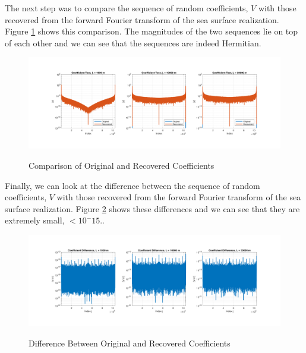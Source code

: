 The next step was to compare the sequence of random coefficients, $V$ with those recovered from the forward Fourier transform of the sea surface realization. Figure \ref{os_fig:10} shows this comparison. The magnitudes of the two sequences lie on top of each other and we can see that the sequences are indeed Hermitian.
\begin{figure}[H]
  \begin{center}
\includegraphics[width=6in]{../media/Ocean_Surface/random_variable_test.png}
  \end{center}
  \renewcommand{\baselinestretch}{1} \small\normalsize
  \begin{quote}
    \caption[Comparison of Original and Recovered Coefficients]{Comparison of Original and Recovered Coefficients\label{os_fig:10}}
  \end{quote}
\end{figure}
\renewcommand{\baselinestretch}{2} \small\normalsize

Finally, we can look at the difference between the sequence of random coefficients, $V$ with those recovered from the forward Fourier transform of the sea surface realization. Figure \ref{os_fig:11} shows these differences and we can see that they are extremely small, $ < 10^-15$..
\begin{figure}[H]
  \begin{center}
\includegraphics[width=6in]{../media/Ocean_Surface/random_variable_diff_test.png}
  \end{center}
  \renewcommand{\baselinestretch}{1} \small\normalsize
  \begin{quote}
    \caption[Difference Between Original and Recovered Coefficients]{Difference Between Original and Recovered Coefficients\label{os_fig:11}}
  \end{quote}
\end{figure}
\renewcommand{\baselinestretch}{2} \small\normalsize
